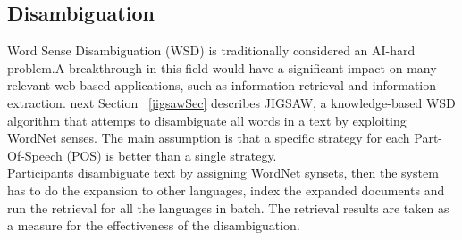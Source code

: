 \subsection{Disambiguation}                                            
Word Sense Disambiguation (WSD) is traditionally considered an AI-hard problem.A breakthrough in this field would have a significant impact on many relevant web-based applications, such as information retrieval and information extraction. next Section ~\ref{jigsawSec} describes JIGSAW, a knowledge-based  WSD algorithm that attemps to disambiguate all words in a text by exploiting WordNet senses. The main assumption is that a specific strategy for each Part-Of-Speech (POS)  is better than a single strategy.\\
Participants disambiguate text by assigning WordNet synsets, then the  system has to do the expansion to other languages, index the expanded documents and run the retrieval for all the languages in batch. The retrieval results are taken as a measure for the effectiveness of the disambiguation.

